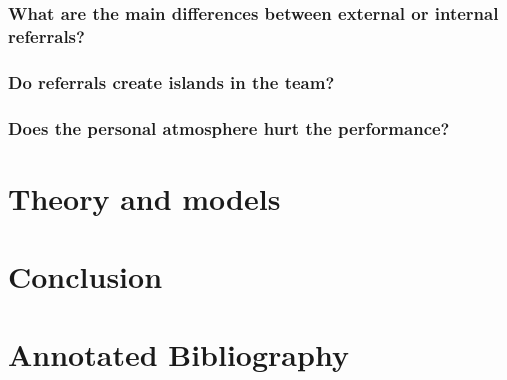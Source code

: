\documentclass[a4paper, 11pt]{article} %
\begin{document}
\subsubsection*{What are the main differences between external or internal referrals?}
\subsubsection*{Do referrals create islands in the team?}
\subsubsection*{Does the personal atmosphere hurt the performance?}

\section*{Theory and models}

\section*{Conclusion}

\section*{Annotated Bibliography}







\end{document}
